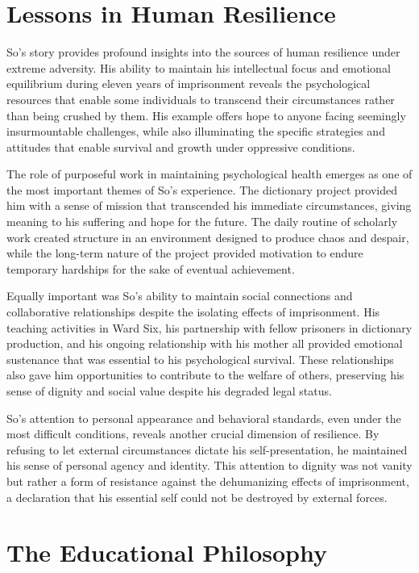 \documentclass[
  Letterpaper,
]{scrbook}
\begin{document}
\section{Lessons in Human Resilience}\label{lessons-in-human-resilience}

So's story provides profound insights into the sources of human
resilience under extreme adversity. His ability to maintain his
intellectual focus and emotional equilibrium during eleven years of
imprisonment reveals the psychological resources that enable some
individuals to transcend their circumstances rather than being crushed
by them. His example offers hope to anyone facing seemingly
insurmountable challenges, while also illuminating the specific
strategies and attitudes that enable survival and growth under
oppressive conditions.

The role of purposeful work in maintaining psychological health emerges
as one of the most important themes of So's experience. The dictionary
project provided him with a sense of mission that transcended his
immediate circumstances, giving meaning to his suffering and hope for
the future. The daily routine of scholarly work created structure in an
environment designed to produce chaos and despair, while the long-term
nature of the project provided motivation to endure temporary hardships
for the sake of eventual achievement.

Equally important was So's ability to maintain social connections and
collaborative relationships despite the isolating effects of
imprisonment. His teaching activities in Ward Six, his partnership with
fellow prisoners in dictionary production, and his ongoing relationship
with his mother all provided emotional sustenance that was essential to
his psychological survival. These relationships also gave him
opportunities to contribute to the welfare of others, preserving his
sense of dignity and social value despite his degraded legal status.

So's attention to personal appearance and behavioral standards, even
under the most difficult conditions, reveals another crucial dimension
of resilience. By refusing to let external circumstances dictate his
self-presentation, he maintained his sense of personal agency and
identity. This attention to dignity was not vanity but rather a form of
resistance against the dehumanizing effects of imprisonment, a
declaration that his essential self could not be destroyed by external
forces.

\section{The Educational Philosophy}\label{the-educational-philosophy}
\end{document}
